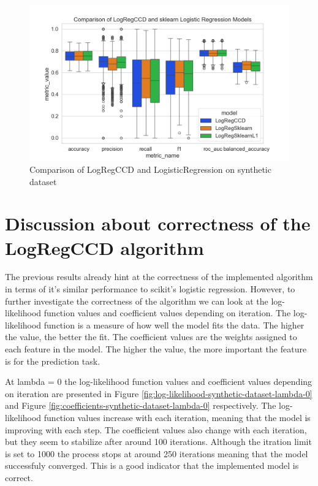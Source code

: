 \documentclass[11pt]{article}
\begin{document}
\begin{figure}[h]
    \centering
  \includegraphics[width=\textwidth]{../results/comparison-synthetic-dataset.png}
    \caption{Comparison of LogRegCCD and LogisticRegression on synthetic dataset}
    \label{fig:comparison-synthetic-dataset}
  \end{figure}



\section{Discussion about correctness of the LogRegCCD algorithm}

The previous results already hint at the correctness of the implemented algorithm in terms of it's similar performance to scikit's logistic regression. However, to further investigate the correctness of the algorithm we can look at the log-likelihood function values and coefficient values depending on iteration. The log-likelihood function is a measure of how well the model fits the data. The higher the value, the better the fit. The coefficient values are the weights assigned to each feature in the model. The higher the value, the more important the feature is for the prediction task. \par

At lambda = 0 the log-likelihood function values and coefficient values depending on iteration are presented in Figure \ref{fig:log-likelihood-synthetic-dataset-lambda-0} and Figure \ref{fig:coefficients-synthetic-dataset-lambda-0} respectively. The log-likelihood function values increase with each iteration, meaning that the model is improving with each step. The coefficient values also change with each iteration, but they seem to stabilize after around 100 iterations. Although the itration limit is set to 1000 the process stops at around 250 iterations meaning that the model successfuly converged. This is a good indicator that the implemented model is correct.\par
\end{document}
